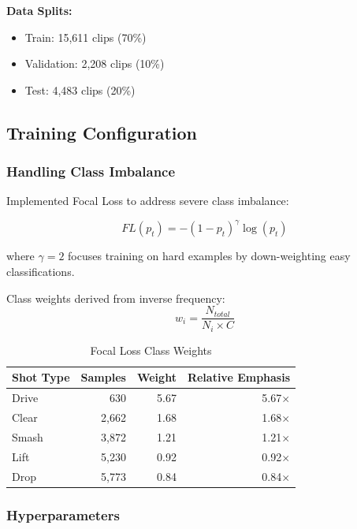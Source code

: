 \documentclass[12pt,a4paper]{article}
\begin{document}
\textbf{Data Splits:}
\begin{itemize}
\item Train: 15,611 clips (70\%)
\item Validation: 2,208 clips (10\%)
\item Test: 4,483 clips (20\%)
\end{itemize}

\subsection{Training Configuration}

\subsubsection{Handling Class Imbalance}

Implemented Focal Loss \cite{FocalLoss} to address severe class imbalance:

\begin{equation}
FL(p_t) = -(1-p_t)^\gamma \log(p_t)
\end{equation}

where $\gamma = 2$ focuses training on hard examples by down-weighting easy classifications.

Class weights derived from inverse frequency:
\begin{equation}
w_i = \frac{N_{total}}{N_i \times C}
\end{equation}

\begin{table}[H]
\centering
\caption{Focal Loss Class Weights}
\begin{tabular}{lrrr}
\toprule
Shot Type & Samples & Weight & Relative Emphasis \\
\midrule
Drive & 630 & 5.67 & 5.67$\times$ \\
Clear & 2,662 & 1.68 & 1.68$\times$ \\
Smash & 3,872 & 1.21 & 1.21$\times$ \\
Lift & 5,230 & 0.92 & 0.92$\times$ \\
Drop & 5,773 & 0.84 & 0.84$\times$ \\
\bottomrule
\end{tabular}
\end{table}

\subsubsection{Hyperparameters}
\end{document}
